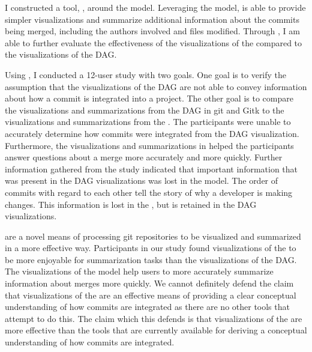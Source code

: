 I constructed a tool, \tool{}, around the \mt{} model. Leveraging the
model, \tool{} is able to provide simpler visualizations and summarize
additional information about the commits being merged, including the
authors involved and files modified. Through \tool{}, I am able to
further evaluate the effectiveness of the visualizations of the \mt{}
compared to the visualizations of the DAG\@.

Using \tool{}, I conducted a 12-user study with two goals. One goal is
to verify the assumption that the visualizations of the DAG are not able
to convey information about how a commit is integrated into a project.
The other goal is to compare the visualizations and summarizations from
the DAG in git and Gitk to the visualizations and summarizations from
the \mt{}. The participants were unable to accurately determine how
commits were integrated from the DAG visualization. Furthermore, the
visualizations and summarizations in \tool{} helped the participants
answer questions about a merge more accurately and more quickly. Further
information gathered from the study indicated that important information
that was present in the DAG visualizations was lost in the \mt{} model.
The order of commits with regard to each other tell the story of why a
developer is making changes. This information is lost in the \mt{}, but
is retained in the DAG visualizations.

 are a novel means of processing git repositories to be visualized
and summarized in a more effective way. Participants in our study found
visualizations of the \mt{} to be more enjoyable for summarization tasks
than the visualizations of the DAG\@.
The visualizations of the \mt{}
model help users to more accurately summarize information about merges
more quickly.
We cannot definitely defend the claim that visualizations of the \mt{}
are an effective means of providing a clear conceptual understanding of
how commits are integrated as there are no other tools that attempt to
do this.
The claim which this \paper{} defends is that visualizations of the
\mt{} are more effective
than the tools that are currently available for deriving a conceptual
understanding of how commits are integrated.

